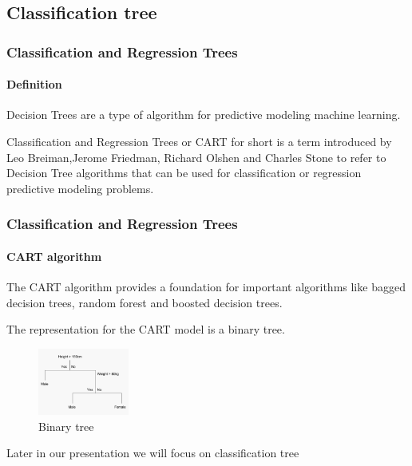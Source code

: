 \subsection{Classification tree} %

\begin{frame}
	\frametitle{Classification and Regression Trees}
		\framesubtitle{Definition}

	\begin{block}{}
		  Decision Trees are a type of algorithm for predictive modeling machine learning.
	\end{block}

	\vfill
		
	Classification and Regression Trees or CART for short is a term introduced by Leo Breiman,Jerome Friedman, Richard Olshen and Charles Stone  to refer to Decision Tree algorithms that can be used for classification or regression predictive modeling problems.

\end{frame}

\begin{frame}
	\frametitle{Classification and Regression Trees}
		\framesubtitle{CART algorithm}

	\begin{block}{}
		The CART algorithm provides a foundation for important algorithms like bagged decision trees, random forest and boosted decision trees.
	\end{block}

	\vfill
		
	The representation for the CART model is a binary tree.
	
	\begin{figure}
		\includegraphics[width=3cm]{./figures/Binary_tree}
		\caption{Binary tree}
	\end{figure}

	\vspace{-0.5cm}

	\tiny Later in our presentation we will focus on  classification tree

\end{frame}

